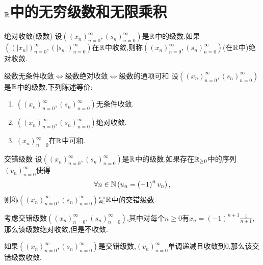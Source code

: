 \section{\texorpdfstring{$\mathbb{R}$}{R}中的无穷级数和无限乘积}

\begin{definition}{绝对收敛(级数)}{}
	设$\left(\left(x_{n}\right)_{n=0}^{\infty},\left(s_{n}\right)_{n=0}^{\infty}\right)$是$\mathbb{R}$中的级数.如果$\left(\left(\left|x_{n}\right|\right)_{n=0}^{\infty},\left(\left|s_{n}\right|\right)_{n=0}^{\infty}\right)$在$\mathbb{R}$中收敛,则称$\left(\left(x_{n}\right)_{n=0}^{\infty},\left(s_{n}\right)_{n=0}^{\infty}\right)$(在$\mathbb{R}$中)绝对收敛.
\end{definition}

\begin{proposition}{级数无条件收敛$\iff$级数绝对收敛$\iff$级数的通项可和}{}
	设$\left(\left(x_{n}\right)_{n=0}^{\infty},\left(s_{n}\right)_{n=0}^{\infty}\right)$是$\mathbb{R}$中的级数.下列陈述等价:
	\begin{enumerate}
		\item $\left(\left(x_{n}\right)_{n=0}^{\infty},\left(s_{n}\right)_{n=0}^{\infty}\right)$无条件收敛.
		\item $\left(\left(x_{n}\right)_{n=0}^{\infty},\left(s_{n}\right)_{n=0}^{\infty}\right)$绝对收敛.
		\item $\left(x_{n}\right)_{n=0}^{\infty}$在$\mathbb{R}$中可和.
	\end{enumerate}
\end{proposition}

\begin{definition}{交错级数}{}
	设$\left(\left(x_{n}\right)_{n=0}^{\infty},\left(s_{n}\right)_{n=0}^{\infty}\right)$是$\mathbb{R}$中的级数.如果存在$\mathbb{R}_{\geq 0}$中的序列$\left(v_{n}\right)_{n=0}^{\infty}$使得
	\begin{align*}
		\forall n\in\mathbb{N}\left(u_{n}=\left(-1\right)^{n}v_{n}\right),
	\end{align*}
	则称$\left(\left(x_{n}\right)_{n=0}^{\infty},\left(s_{n}\right)_{n=0}^{\infty}\right)$是$\mathbb{R}$中的交错级数.
\end{definition}

\begin{example}{}{}
	考虑交错级数$\left(\left(x_{n}\right)_{n=0}^{\infty},\left(s_{n}\right)_{n=0}^{\infty}\right)$,其中对每个$n\geq 0$有$x_{n}=\left(-1\right)^{n+1}\frac{1}{n+1}$,那么该级数绝对收敛,但是不收敛.
\end{example}

\begin{remark}{}{}
	如果$\left(\left(x_{n}\right)_{n=0}^{\infty},\left(s_{n}\right)_{n=0}^{\infty}\right)$是交错级数,$\left(v_{n}\right)_{n=0}^{\infty}$单调递减且收敛到$0$,那么该交错级数收敛.
\end{remark}

